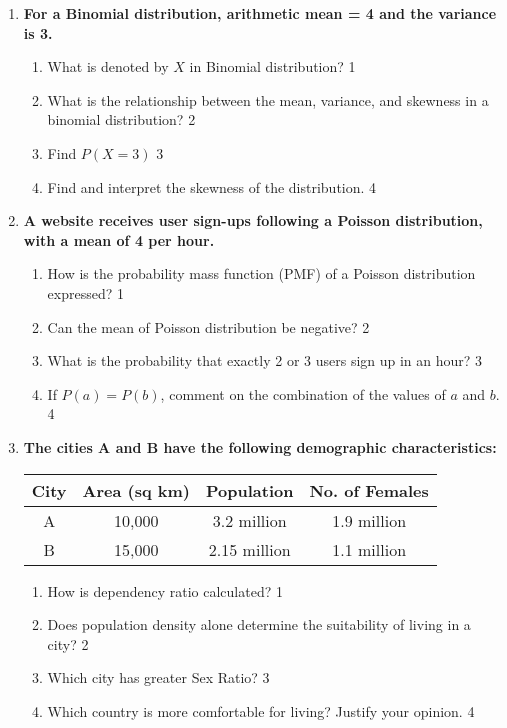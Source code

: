 \documentclass[12pt]{article}
\begin{document}
\begin{enumerate}
   \item
	  \textbf{For a Binomial distribution, arithmetic mean = 4 and the variance is 3.} 
  
  \begin{enumerate}
     \item What is denoted by $X$ in Binomial distribution? \hfill 1
     \item What is the relationship between the mean, variance, and skewness in a binomial distribution? \hfill 2
    \item  
	Find $P(X = 3)$ \hfill 3
    \item
	Find and interpret the skewness of the distribution. \hfill 4
  \end{enumerate}
  
  \item
  \textbf{A website receives user sign-ups following a Poisson distribution, with a mean of 4 per hour.}  
  
  \begin{enumerate}
  \item How is the probability mass function (PMF) of a Poisson distribution expressed? \hfill 1
   \item
	Can the mean of Poisson distribution be negative? \hfill 2
    \item  
      What is the probability that exactly 2 or 3 users sign up in an hour? \hfill 3  
    \item  
      If $P(a) = P(b)$, comment on the combination of the values of $a$ and $b$. \hfill 4  
  \end{enumerate}
  
  
   \item
	  \textbf{The cities A and B have the following demographic characteristics:} 
  
  \begin{table}[H]
\centering
\begin{tabular}{c|c|c|c}
City & Area (sq km) & Population & No. of Females \\ \hline
A & 10,000 & 3.2 million & 1.9 million \\
B & 15,000 & 2.15 million & 1.1 million
\end{tabular}
\end{table}

  
  \begin{enumerate}
    \item How is dependency ratio calculated? \hfill 1
      \item Does population density alone determine the suitability of living in a city? \hfill 2
    \item  
	Which city has greater Sex Ratio? \hfill 3
    \item
	Which country is more comfortable for living? Justify your opinion. \hfill 4
  \end{enumerate}
  
\end{enumerate}

 \vspace{2.5cm}

\iffalse
\begin{center}
 “Quote” \\ -- Author
\end{center}
\fi
\end{document}
